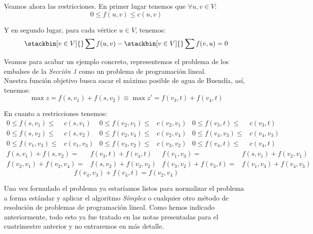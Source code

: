 Veamos ahora las restricciones. En primer lugar tenemos que $\forall u,v\in V$:
\[0\leq f(u,v)\leq c(u,v)\]

Y en segundo lugar, para cada vértice $u\in V$, tenemos:
\[\stackbin[v\in V]{}\sum f(u,v)- \stackbin[v\in V]{}\sum f(v,u)=0\]

\begin{ejem} Veamos para acabar un ejemplo concreto, representemos el problema de los embalses de la \textit{Sección 1} como un problema de programación lineal.\\

Nuestra función objetivo busca sacar el máximo posible de agua de Buendía, así, tenemos:
\[\max z = f(s,v_1)+f(s,v_2)\equiv \max z'=f(v_3,t)+f(v_4,t)\]

En cuanto a restricciones tenemos:
\begin{align*}
0\leq f(s,v_1)\leq& c(s,v_1)		&  0\leq f(v_2,v_1)\leq& c(v_2,v_1)         &  0\leq f(v_3,t)\leq& c(v_3,t)\\
0\leq f(s,v_2)\leq& c(s,v_2)        &  0\leq f(v_2,v_4)\leq& c(v_2,v_4)			&  0\leq f(v_4,v_3)\leq& c(v_4,v_3)\\	
0\leq f(v_1,v_3)\leq& c(v_1,v_3)  	&  0\leq f(v_3,v_2)\leq& c(v_3,v_2)			&  0\leq f(v_4,t)\leq& c(v_4,t)
\end{align*}
\begin{align*}
f(s,v_1)+f(s,v_2)=&f(v_3,t)+f(v_4,t)& f(v_1,v_3)=&f(s,v_1) + f(v_2,v_1)\\
f(v_2,v_1)+f(v_2,v_4)=&f(s,v_2)+f(v_3,v_2)&f(v_3,v_2)+f(v_3,t)=&f(v_1,v_3)+f(v_4,v_3)
\end{align*}
\[f(v_4,v_3)+f(v_4,t)=f(v_2,v_4)\]

Una vez formulado el problema ya estaríamos listos para normalizar el problema a forma estándar y aplicar el algoritmo \textit{Símplex} o cualquier otro método de resolución de problemas de programación lineal. Como hemos indicado anteriormente, todo esto ya fue tratado en las notas presentadas para el cuatrimestre anterior y no entraremos en más detalle.
\end{ejem}